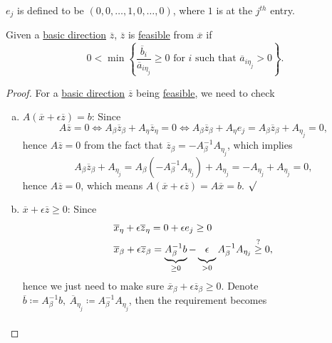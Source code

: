 \begin{notation}
	\(e_j\) is defined to be \((0, 0, \dots, 1, 0, \dots , 0 )\), where \(1\) is at the \(j^{th} \) entry.
\end{notation}

\begin{lemma}\label{lma:lec6-1}
	Given a \hyperref[def:basic-direction]{basic direction} \(\overline{z}\), \(\overline{z}\) is \hyperref[def:feasible-direction]{feasible} from \(\overline{x}\) if
	\[
		0< \min\left\{\frac{\overline{b}_i}{\overline{a}_{i \eta_{j}}}\geq 0 \text{ for }i \text{ such that }\overline{a}_{i \eta_{j}}>0\right\}.
	\]
\end{lemma}
\begin{proof}
	For a \hyperref[def:basic-direction]{basic direction} \(\overline{z}\) being \hyperref[def:feasible-direction]{feasible}, we need to check
	\begin{enumerate}[(a)]
		\item \(A(\overline{x} + \epsilon \overline{z}) = b\): Since
		      \[
			      A \overline{z} = 0 \iff A_{\beta}\overline{z}_{\beta} + A_{\eta}\overline{z}_{\eta} = 0 \iff A_{\beta}\overline{z}_{\beta}+A_{\eta}e_{j} = A_{\beta}\overline{z}_{\beta}+A_{\eta_j} = 0,
		      \]
		      hence \(A \overline{z} = 0\) from the fact that \(\overline{z} _\beta = - A_\beta ^{-1} A_{\eta _{j} }\), which implies
		      \[
			      A_\beta \overline{z} _\beta + A_{\eta _{j} } = A_\beta (- A_\beta ^{-1} A_{\eta _{j} }) + A_{\eta _{j} } = -A_{\eta _{j} } + A_{\eta _{j} } = 0,
		      \]
		      hence \(A \overline{z} = 0\), which means \(A(\overline{x} +\epsilon \overline{z} ) = A \overline{x} = b\). \(\surd\)
		\item \(\overline{x} + \epsilon \overline{z} \geq 0\): Since
		      \[
			      \begin{split}
				      &\overline{x}_{\eta} + \epsilon \overline{z}_{\eta} = 0 + \epsilon e_j \geq  0\\
				      &\overline{x}_{\beta}+ \epsilon \overline{z}_{\beta} = \underbrace{A^{-1}_{\beta}b}_{\geq 0} - \underbrace{\vphantom{A^{-1}_{\beta}}\epsilon}_{>0} A^{-1}_{\beta}A_{\eta_j}\overset{?}{\geq} 0,
			      \end{split}
		      \]
		      hence we just need to make sure \(\overline{x} _\beta + \epsilon \overline{z} _\beta \geq 0\). Denote \(\overline{b} \coloneqq A^{-1}_{\beta} b,\ \overline{A}_{\eta_j} \coloneqq A^{-1}_{\beta}A_{\eta_j}\), then the requirement becomes
		      \[
			      \begin{aligned}

\end{aligned}\]
\end{enumerate}
\end{proof}
